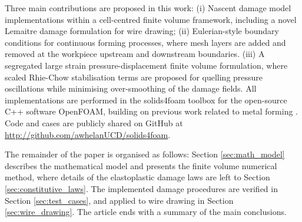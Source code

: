 \documentclass[sn-mathphys,Numbered]{sn-jnl}%
\begin{document}
Three main contributions are proposed in this work:
(i) Nascent damage model implementations within a cell-centred finite volume framework, including a novel Lemaitre damage formulation for wire drawing;
(ii) Eulerian-style boundary conditions for continuous forming processes, where mesh layers are added and removed at the workpiece upstream and downstream boundaries.
(iii) A segregated large strain pressure-displacement finite volume formulation, where scaled Rhie-Chow stabilisation terms are proposed for quelling pressure oscillations while minimising over-smoothing of the damage fields.
All implementations are performed in the solids4foam toolbox \cite{Cardiff2018, Tukovic2018} for the open-source C++ software OpenFOAM, building on previous work related to metal forming \cite{cardiff_lagrangian_2017, clancy_improving_2019}.
Code and cases are publicly shared on GitHub at \url{http://github.com/awhelanUCD/solids4foam}.


The remainder of the paper is organised as follows:
Section \ref{sec:math_model} describes the mathematical model and presents the finite volume numerical method, where details of the elastoplastic damage laws are left to Section \ref{sec:constitutive_laws}.
The implemented damage procedures are verified in Section \ref{sec:test_cases}, and applied to wire drawing in Section \ref{sec:wire_drawing}.
The article ends with a summary of the main conclusions.
\end{document}
